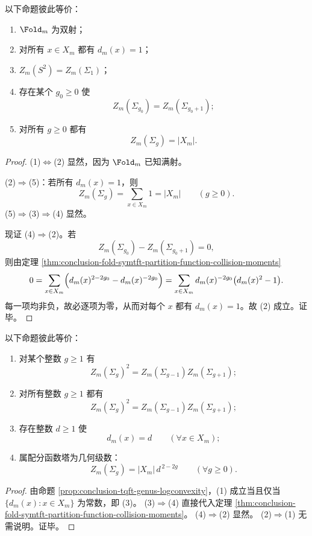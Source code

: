 \begin{theorem}[属配分函数塔的平凡化判据]\label{thm:conclusion-tqft-genus-tower-trivialization-criterion}
以下命题彼此等价：
\begin{enumerate}
  \item \(\Fold_m\) 为双射；
  \item 对所有 \(x\in X_m\) 都有 \(d_m(x)=1\)；
  \item \(Z_m(S^2)=Z_m(\Sigma_1)\)；
  \item 存在某个 \(g_0\ge 0\) 使
  \[
  Z_m(\Sigma_{g_0})=Z_m(\Sigma_{g_0+1});
  \]
  \item 对所有 \(g\ge 0\) 都有
  \[
  Z_m(\Sigma_g)=|X_m|.
  \]
\end{enumerate}
\end{theorem}
\begin{proof}
\textup{(1)}\(\Leftrightarrow\)\textup{(2)} 显然，因为 \(\Fold_m\) 已知满射。

\textup{(2)}\(\Rightarrow\)\textup{(5)}：若所有 \(d_m(x)=1\)，则
\[
Z_m(\Sigma_g)=\sum_{x\in X_m}1=|X_m|
\qquad(g\ge 0).
\]
\textup{(5)}\(\Rightarrow\)\textup{(3)}\(\Rightarrow\)\textup{(4)} 显然。

现证 \textup{(4)}\(\Rightarrow\)\textup{(2)}。若
\[
Z_m(\Sigma_{g_0})-Z_m(\Sigma_{g_0+1})=0,
\]
则由定理 \ref{thm:conclusion-fold-symtft-partition-function-collision-moments}
\[
0
=
\sum_{x\in X_m}\Bigl(d_m(x)^{2-2g_0}-d_m(x)^{-2g_0}\Bigr)
=
\sum_{x\in X_m}d_m(x)^{-2g_0}\bigl(d_m(x)^2-1\bigr).
\]
每一项均非负，故必逐项为零，从而对每个 \(x\) 都有 \(d_m(x)=1\)。故 \textup{(2)} 成立。证毕。
\end{proof}

\begin{corollary}[属塔对数凸性的统一纤维刚性判据]\label{cor:conclusion-tqft-genus-logconvexity-rigidity-equivalences}
以下命题彼此等价：
\begin{enumerate}
  \item 对某个整数 \(g\ge 1\) 有
  \[
  Z_m(\Sigma_g)^2=Z_m(\Sigma_{g-1})Z_m(\Sigma_{g+1});
  \]
  \item 对所有整数 \(g\ge 1\) 都有
  \[
  Z_m(\Sigma_g)^2=Z_m(\Sigma_{g-1})Z_m(\Sigma_{g+1});
  \]
  \item 存在整数 \(d\ge 1\) 使
  \[
  d_m(x)=d\qquad(\forall x\in X_m);
  \]
  \item 属配分函数塔为几何级数：
  \[
  Z_m(\Sigma_g)=|X_m|\,d^{\,2-2g}\qquad(\forall g\ge 0).
  \]
\end{enumerate}
\end{corollary}
\begin{proof}
由命题 \ref{prop:conclusion-tqft-genus-logconvexity}，\textup{(1)} 成立当且仅当 \(\{d_m(x):x\in X_m\}\) 为常数，即 \textup{(3)}。
\textup{(3)}\(\Rightarrow\)\textup{(4)} 直接代入定理 \ref{thm:conclusion-fold-symtft-partition-function-collision-moments}。
\textup{(4)}\(\Rightarrow\)\textup{(2)} 显然。
\textup{(2)}\(\Rightarrow\)\textup{(1)} 无需说明。证毕。
\end{proof}

